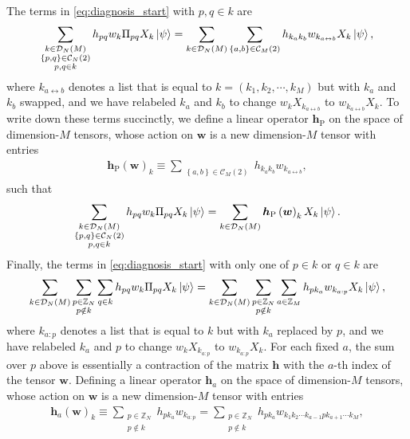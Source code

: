 \documentclass[nofootinbib,notitlepage,11pt]{revtex4-2}
\renewcommand{\t}{\text} %
\newcommand{\p}[1]{\left(#1\right)} %
\renewcommand{\set}[1]{\left\{#1\right\}} %
\newcommand{\m}{\bm} %
\newcommand{\1}{\mathds{1}}
\newcommand{\C}{\mathcal{C}}
\newcommand{\D}{\mathcal{D}}
\newcommand{\ZZ}{\mathbb{Z}}
\newcommand{\lra}{\leftrightarrow}
\begin{document}
The terms in \eqref{eq:diagnosis_start} with $p,q\in k$ are
\begin{align}
  \sum_{\substack{k\in\D_N\p{M}\\\set{p,q}\in\C_N\p{2}\\p,q\in k}}
  h_{pq} w_k \Pi_{pq} X_k \ket\psi
  = \sum_{k\in\D_N\p{M}} \sum_{\substack{\set{a,b}\in\C_M\p{2}}}
  h_{k_ak_b} w_{k_{a\lra b}} X_k \ket\psi,
\end{align}
where $k_{a\lra b}$ denotes a list that is equal to
$k=\p{k_1,k_2,\cdots,k_M}$ but with $k_a$ and $k_b$ swapped, and we
have relabeled $k_a$ and $k_b$ to change $w_k X_{k_{a\lra b}}$ to
$w_{k_{a\lra b}} X_k$.  To write down these terms succinctly, we
define a linear operator $\m h_{\t{P}}$ on the space of dimension-$M$
tensors, whose action on $\m w$ is a new dimension-$M$ tensor with
entries
\begin{align}
  \m h_{\t{P}}\p{\m w}_k
  \equiv \sum_{\substack{\set{a,b}\in\C_M\p{2}}}
  h_{k_ak_b} w_{k_{a\lra b}},
  \label{eq:multi_body_op_perm}
\end{align}
such that
\begin{align}
  \sum_{\substack{k\in\D_N\p{M}\\\set{p,q}\in\C_N\p{2}\\p,q\in k}}
  h_{pq} w_k \Pi_{pq} X_k \ket\psi
  = \sum_{k\in\D_N\p{M}} \m h_{\t{P}}\p{\m w}_k X_k \ket\psi.
\end{align}
Finally, the terms in \eqref{eq:diagnosis_start} with only one of
$p\in k$ or $q\in k$ are
\begin{align}
  \sum_{k\in\D_N\p{M}} \sum_{\substack{p\in\ZZ_N\\p\notin k}}
  \sum_{q\in k} h_{pq} w_k  \Pi_{pq} X_k \ket\psi
  = \sum_{k\in\D_N\p{M}} \sum_{\substack{p\in\ZZ_N\\p\notin k}}
  \sum_{a\in\ZZ_M} h_{pk_a} w_{k_{a:p}} X_k \ket\psi,
\end{align}
where $k_{a:p}$ denotes a list that is equal to $k$ but with $k_a$
replaced by $p$, and we have relabeled $k_a$ and $p$ to change
$w_k X_{k_{a:p}}$ to $w_{k_{a:p}} X_k$.  For each fixed $a$, the sum
over $p$ above is essentially a contraction of the matrix $\m h$ with
the $a$-th index of the tensor $\m w$.  Defining a linear operator
$\m h_a$ on the space of dimension-$M$ tensors, whose action on $\m w$
is a new dimension-$M$ tensor with entries
\begin{align}
  \m h_a\p{\m w}_k
  \equiv \sum_{\substack{p\in\ZZ_N\\p\notin k}} h_{pk_a} w_{k_{a:p}}
  = \sum_{\substack{p\in\ZZ_N\\p\notin k}}
  h_{pk_a} w_{k_1 k_2 \cdots k_{a-1} p k_{a+1} \cdots k_M},
  \label{eq:multi_body_op_contract}
\end{align}
\end{document}
